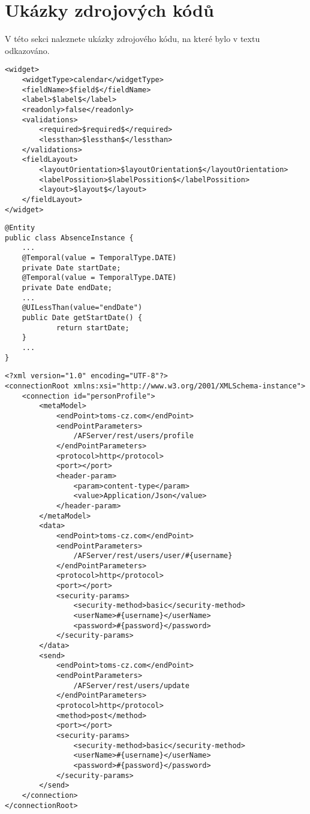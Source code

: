 \chapter{Ukázky zdrojových kódů}
V této sekci naleznete ukázky zdrojového kódu, na které bylo v textu odkazováno.
\newpage
\begin{lstlisting}[caption=Upravená šablona date.xml,
label={code:dateXml}, basicstyle=\footnotesize]
<widget>
	<widgetType>calendar</widgetType>
	<fieldName>$field$</fieldName>
	<label>$label$</label>
	<readonly>false</readonly>
	<validations>
		<required>$required$</required>
		<lessthan>$lessthan$</lessthan>
	</validations>
	<fieldLayout>
		<layoutOrientation>$layoutOrientation$</layoutOrientation>
		<labelPossition>$labelPossition$</labelPossition>
		<layout>$layout$</layout>
	</fieldLayout>
</widget>
\end{lstlisting}

\begin{lstlisting}[caption=Ukázka použití anotace @UILessThan,
label={code:uiLessThanUsage}, basicstyle=\footnotesize]
@Entity
public class AbsenceInstance {
	...
	@Temporal(value = TemporalType.DATE)
	private Date startDate;
	@Temporal(value = TemporalType.DATE)
	private Date endDate;
	...
	@UILessThan(value="endDate")
	public Date getStartDate() {
        	return startDate;
	}
	...
}
\end{lstlisting}

\begin{lstlisting}[float=h, caption=Ukázka XML specifikace zdrojů,
label={code:xmlSource}, basicstyle=\footnotesize]
<?xml version="1.0" encoding="UTF-8"?>
<connectionRoot xmlns:xsi="http://www.w3.org/2001/XMLSchema-instance">
	<connection id="personProfile">
		<metaModel>
			<endPoint>toms-cz.com</endPoint>
			<endPointParameters>
				/AFServer/rest/users/profile
			</endPointParameters>
			<protocol>http</protocol>
			<port></port>
			<header-param>
				<param>content-type</param>
				<value>Application/Json</value>
			</header-param>
		</metaModel>
		<data>
			<endPoint>toms-cz.com</endPoint>
			<endPointParameters>
				/AFServer/rest/users/user/#{username}
			</endPointParameters>
			<protocol>http</protocol>
			<port></port>
			<security-params>
				<security-method>basic</security-method>
				<userName>#{username}</userName>
				<password>#{password}</password>
			</security-params>
		</data>
		<send>
			<endPoint>toms-cz.com</endPoint>
			<endPointParameters>
				/AFServer/rest/users/update
			</endPointParameters>
			<protocol>http</protocol>
			<method>post</method>
			<port></port>
			<security-params>
				<security-method>basic</security-method>
				<userName>#{username}</userName>
				<password>#{password}</password>
			</security-params>
		</send>
	</connection>
</connectionRoot>
\end{lstlisting}

